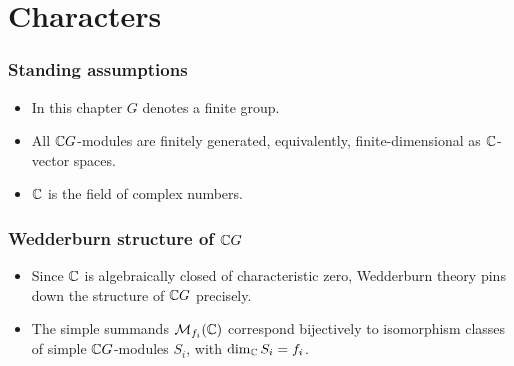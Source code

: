 \documentclass[../Odyssey_Project.tex]{subfiles}
\begin{document}
\setcounter{section}{13}
\section{Characters}

\subsubsection*{Standing assumptions}
\begin{itemize}
    \item In this chapter $G$ denotes a finite group.
    \item All $\mathbb{C} G$-modules are finitely generated, equivalently, finite-dimensional as $\mathbb{C}$-vector spaces.
    \item $\mathbb{C}$ is the field of complex numbers.
\end{itemize}

\subsubsection*{Wedderburn structure of $\mathbb{C} G$}
\begin{itemize}
    \item Since $\mathbb{C}$ is algebraically closed of characteristic zero, Wedderburn theory pins down the structure of $\mathbb{C} G$ precisely.
    \item The simple summands $\mathcal{M}_{f_i}(\mathbb{C})$ correspond bijectively to isomorphism classes of simple $\mathbb{C} G$-modules $S_i$, with $\dim_{\mathbb{C}} S_i = f_i$.
\end{itemize}
\end{document}
